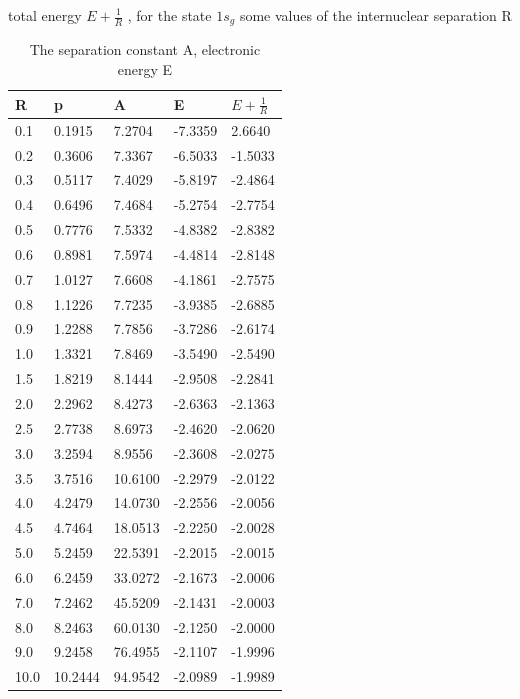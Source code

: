    \begin{table}[h!]
  \caption{ The separation constant A, electronic energy E}{total energy $ E + \frac{1}{R} $ , for the state $ 1s_g $ some values of the internuclear separation R }
  \centering
  \label{1sg}
		\begin{tabular}{ m{6em} m{6em}  m{6em}  m{6em} m{6em} }
			\hline
			R & p & A & E & $ E + \frac{1}{R} $ \\ \hline \hline
      0.1 & 0.1915 & 7.2704 & -7.3359 & 2.6640 \\
      0.2 & 0.3606 & 7.3367 & -6.5033 & -1.5033 \\
      0.3 & 0.5117 & 7.4029 & -5.8197 & -2.4864 \\
      0.4 & 0.6496 & 7.4684 & -5.2754 & -2.7754 \\
      0.5 & 0.7776 & 7.5332 & -4.8382 & -2.8382 \\
      0.6 & 0.8981 & 7.5974 & -4.4814 & -2.8148 \\
      0.7 & 1.0127 & 7.6608 & -4.1861 & -2.7575 \\
      0.8 & 1.1226 & 7.7235 & -3.9385 & -2.6885 \\
      0.9 & 1.2288 & 7.7856 & -3.7286 & -2.6174 \\
      1.0 & 1.3321 & 7.8469 & -3.5490 & -2.5490 \\
      1.5 & 1.8219 & 8.1444 & -2.9508 & -2.2841 \\
      2.0 & 2.2962 & 8.4273 & -2.6363 & -2.1363 \\
      2.5 & 2.7738 & 8.6973 & -2.4620 & -2.0620 \\
      3.0 & 3.2594 & 8.9556 & -2.3608 & -2.0275 \\
      3.5 & 3.7516 & 10.6100 & -2.2979 & -2.0122 \\
      4.0 & 4.2479 & 14.0730 & -2.2556 & -2.0056 \\
      4.5 & 4.7464 & 18.0513 & -2.2250 & -2.0028 \\
      5.0 & 5.2459 & 22.5391 & -2.2015 & -2.0015 \\
      6.0 & 6.2459 & 33.0272 & -2.1673 & -2.0006 \\
      7.0 & 7.2462 & 45.5209 & -2.1431 & -2.0003 \\
      8.0 & 8.2463 & 60.0130 & -2.1250 & -2.0000 \\
      9.0 & 9.2458 & 76.4955 & -2.1107 & -1.9996 \\
      10.0 & 10.2444 & 94.9542 & -2.0989 & -1.9989 \\
			\hline
		\end{tabular}
    \end{table}

